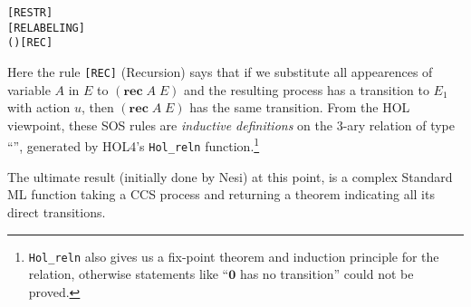 \begin{alltt}
   \HOLSymConst{\ensuremath{\nu}}   \HOLTokenTransBegin{}\HOLTokenTransEnd \HOLSymConst{\ensuremath{\nu}}  \hfill\texttt{[RESTR]}
\HOLTokenTurnstile{}  \HOLTokenTransBegin{}\HOLTokenTransEnd {} \HOLSymConst{\HOLTokenImp{}}    \HOLTokenTransBegin{}  \HOLTokenTransEnd {}  \hfill\texttt{[RELABELING]}
\HOLTokenTurnstile{}   (  )  \HOLTokenTransBegin{}\HOLTokenTransEnd {} \HOLSymConst{\HOLTokenImp{}}    \HOLTokenTransBegin{}\HOLTokenTransEnd {}\hfill\texttt{[REC]}
\end{alltt}

Here the rule \texttt{[REC]} (Recursion)
 says that if we substitute all appearences of variable $A$ in $E$ to
$(\mathbf{rec}\; A\; E)$ and the resulting process has a transition to $E_1$
with action $u$, then $(\mathbf{rec}\; A\; E)$ has the same
transition. From the HOL  viewpoint, these
SOS rules are \emph{inductive 
  definitions} on the 3-ary relation  of type ``'', generated by HOL4's 
\texttt{Hol_reln} function.\footnote{\texttt{Hol_reln} also
gives us a fix-point theorem and induction principle for the
relation, otherwise statements like ``$\textbf{0}$ has no transition''
could not be proved.}

The ultimate result (initially done by Nesi)
at this point, is a complex Standard ML function
  taking a CCS process and returning a theorem indicating all its direct transitions.

